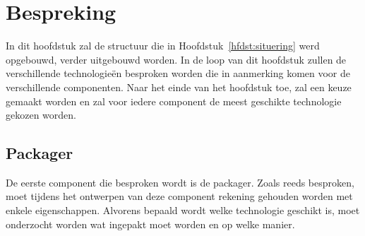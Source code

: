 \chapter{Bespreking}\label{hfdst:bespreking}
In dit hoofdstuk zal de structuur die in Hoofdstuk~\vref{hfdst:situering} werd opgebouwd, verder uitgebouwd worden.
In de loop van dit hoofdstuk zullen de verschillende technologieën besproken worden die in aanmerking komen voor de verschillende componenten.
Naar het einde van het hoofdstuk toe, zal een keuze gemaakt worden en zal voor iedere component de meest geschikte technologie gekozen worden.

\section{Packager}
De eerste component die besproken wordt is de packager.
Zoals reeds besproken, moet tijdens het ontwerpen van deze component rekening gehouden worden met enkele eigenschappen.
Alvorens bepaald wordt welke technologie geschikt is, moet onderzocht worden wat ingepakt moet worden en op welke manier.

